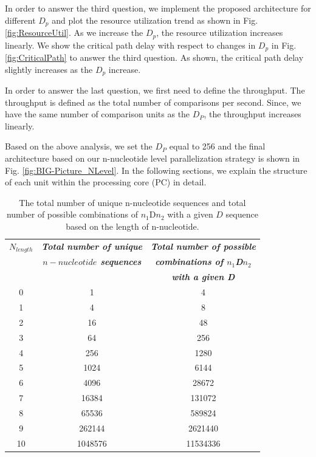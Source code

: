 In order to answer the third question, we implement the proposed architecture for different $D_p$ and plot the resource utilization trend as shown in Fig. \ref{fig:ResourceUtil}. As we increase the $D_p$, the resource utilization increases linearly. We show the critical path delay with respect to changes in $D_p$  in Fig. \ref{fig:CriticalPath} to answer the third question. As shown, the critical path delay slightly increases as the $D_p$ increase. 

In order to answer the last question, we first need to define the throughput. The throughput is defined as the total number of comparisons per second. Since, we have the same number of comparison units as the $D_P$, the throughput increases linearly.

Based on the above analysis, we set the $D_P$ equal to 256 and the final architecture based on our n-nucleotide level parallelization strategy is shown in Fig. \ref{fig:BIG-Picture_NLevel}. In the following sections, we explain the structure of each unit within the processing core (PC) in detail.

\begin{table}[t!]
\caption{The total number of unique n-nucleotide sequences and total number of possible combinations of  $n_1$D$n_2$ with a given $D$ sequence based on the length of n-nucleotide.}
\begin{center}
\begin{tabular}{ |c|c|c| }
  \hline
    \textbf{\textit{$N_{length}$}} & \textbf{\textit{Total number of unique}} & \textbf{\textit{Total number of possible}}\\
    ~ &  \textbf{\textit{$n-nucleotide$ sequences}} & \textbf{\textit{combinations of $n_1$D$n_2$}}\\
    ~&~& \textbf{\textit{with a given D }}\\ \hline	
    0 & 1  	& 4	\\	\hline
    1 & 4 	& 8	\\	\hline
   	2 & 16 	& 48\\	\hline
    3 & 64 	& 256	\\	\hline
    4 & 256 & 1280	\\	\hline
    5 & 1024 &6144 	\\	\hline
    6 & 4096 & 28672	\\	\hline
   	7 & 16384 &131072 	\\	\hline
    8 & 65536 &	589824\\	\hline
    9 & 262144  &2621440 \\	\hline
    10 & 1048576 & 11534336\\
  \hline
\end{tabular}

  \label{tab:1}
\end{center}
\end{table}

